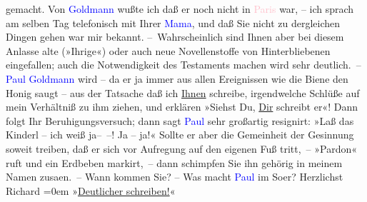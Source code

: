                gemacht. Von \textcolor{blue}{Goldmann}{}\ledrightnote{\textcolor{blue}{Paul Goldmann}} wußte ich daß er noch nicht
               in \textcolor{pink}{Paris}{}\ledrightnote{\textcolor{pink}{Paris}} war, – ich sprach am selben {\pb}Tag telefonisch mit Ihrer \textcolor{blue}{Mama}{}, und daß Sie nicht zu
               dergleichen Dingen gehen war mir bekannt.\pend
           \pstart
           – Wahrscheinlich sind Ihnen aber bei diesem Anlasse alte (»Ihrige«) oder auch neue
               Novellenstoffe von Hinterbliebenen eingefallen; auch {\pb}die Notwendigkeit des Testaments
               machen wird sehr deutlich. –\pend
           \pstart
           \textcolor{blue}{Paul Goldmann}{}\ledrightnote{\textcolor{blue}{Paul Goldmann}} wird – da er ja immer aus allen
               Ereignissen wie die Biene den Honig saugt – aus der Tatsache daß ich \uline{Ihnen}
                schreibe, irgendwelche Schlüße auf mein Verhältniß zu
               ihm ziehen, und erklären {\pb}»Siehst
               Du, \uline{Dir}
                schreibt er«! Dann folgt Ihr
               Beruhigungsversuch; dann sagt \textcolor{blue}{Paul}{}\ledrightnote{\textcolor{blue}{Paul Goldmann}}
                sehr großartig
               resignirt: »Laß das Kinderl – ich weiß ja– –! Ja – ja!« Sollte er aber die
               Gemeinheit der Gesinnung soweit treiben, daß er sich vor Aufregung {\pb}auf den eigenen Fuß tritt, –
               »Pardon« ruft und ein Erdbeben markirt, – dann schimpfen Sie ihn gehörig in
               meinem Namen zusa{\geminationm}en. –\pend
           \pstart
           Wann kommen Sie? –\pend
           \pstart
           Was macht \textcolor{blue}{Paul}{}\ledrightnote{\textcolor{blue}{Paul Goldmann}} im So{\geminationm}er?\pend
           \pstart
           Herzlichst{\\[\baselineskip]}\spacefill\mbox{Richard}\pend
           \leftskip=0em{}\pstart
           »\uline{Deutlicher schreiben!}«\pend
           \endnumbering{}  
      